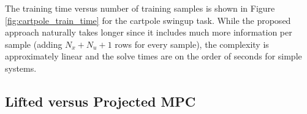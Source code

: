 \documentclass{article}
\begin{document}
The training time versus number of training samples is shown in Figure 
\ref{fig:cartpole_train_time} for the cartpole swingup task. While the proposed approach 
naturally takes longer since it includes much more information per sample (adding 
$N_x + N_u + 1$ rows for every sample), the complexity is approximately linear and the 
solve times are on the order of seconds for simple systems.


\subsection{Lifted versus Projected MPC}
\end{document}
